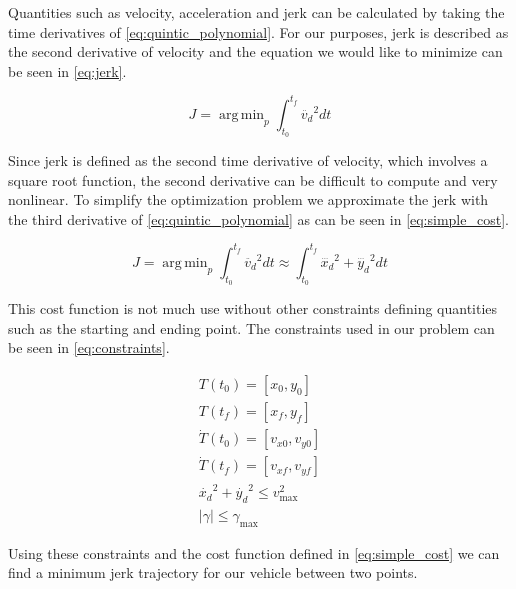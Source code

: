 \documentclass{article}
\DeclareMathOperator*{\argmin}{arg\,min}
\begin{document}
Quantities such as velocity, acceleration and jerk can be calculated by taking the time 
derivatives of \cref{eq:quintic_polynomial}. For our purposes, jerk is described as the
second derivative of velocity and the equation we would like to minimize can be seen in 
\cref{eq:jerk}.

\begin{equation}
  J = \argmin_p \int_{t_0}^{t_f} \ddot{v_d}^2dt
  \label{eq:jerk}
\end{equation}

Since jerk is defined as the second time derivative of velocity, which involves a square root 
function, the second derivative can be difficult to compute and very nonlinear. To simplify the 
optimization problem we approximate the jerk with the third derivative of \cref{eq:quintic_polynomial}
as can be seen in \cref{eq:simple_cost}.

\begin{equation}
  J = \argmin_p \int_{t_0}^{t_f} \ddot{v_d}^2dt \approx
  \int_{t_0}^{t_f} \dddot{x_d}^2 + \dddot{y_d}^2 dt 
  \label{eq:simple_cost}
\end{equation}

This cost function is not much use without other constraints defining quantities such as
the starting and ending point. The constraints used in our problem can be seen in \cref{eq:constraints}.

\begin{equation}
  \begin{aligned}
    T(t_0) = [x_0, y_0] \\
    T(t_f) = [x_f, y_f] \\
    \dot{T}(t_0) = [v_{x0}, v_{y0}] \\
    \dot{T}(t_f) = [v_{xf}, v_{yf}] \\
    \dot{x_d}^2 + \dot{y_d}^2 \leq v_{\max}^2 \\
    \left |\gamma \right | \leq \gamma_{\max}
  \end{aligned}
  \label{eq:constraints}
\end{equation}

Using these constraints and the cost function defined in \cref{eq:simple_cost} we can find a 
minimum jerk trajectory for our vehicle between two points.
\end{document}
